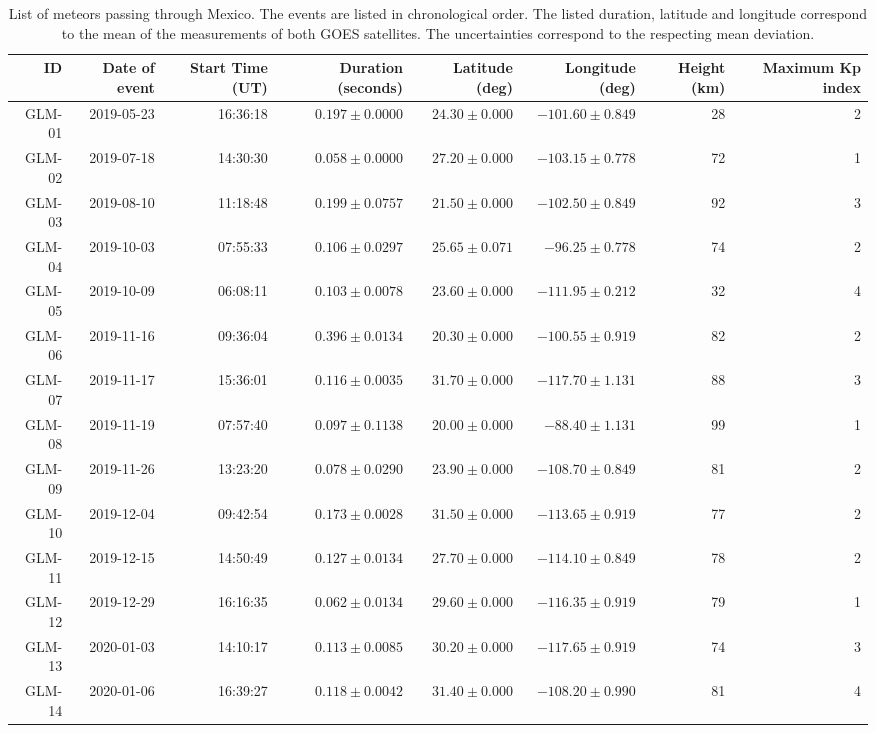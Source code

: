 \begin{table}
  \centering
  \footnotesize
  \caption{List of meteors passing through Mexico. The events are listed in chronological order. The listed duration, latitude and longitude correspond to the mean of the measurements of both GOES satellites. The uncertainties correspond to the respecting mean deviation.}
\label{tab:table-meteors}
\begin{tabular}{rrrrrrrr}
\hline
ID & Date of event & Start Time (UT)  & Duration (seconds) & Latitude (deg) & Longitude (deg) & Height (km) & Maximum Kp index \\
\hline
GLM-01 & 2019-05-23 & 16:36:18 & $0.197\pm 0.0000$ & $24.30 \pm 0.000$ & $-101.60 \pm 0.849$  & 28 & 2\\
GLM-02 & 2019-07-18 & 14:30:30 & $0.058\pm 0.0000$ & $27.20 \pm 0.000$ & $-103.15 \pm 0.778$  & 72 & 1\\
GLM-03 & 2019-08-10 & 11:18:48 & $0.199\pm 0.0757$ & $21.50 \pm 0.000$ & $-102.50  \pm 0.849$ & 92 & 3\\
GLM-04 & 2019-10-03 & 07:55:33 & $0.106\pm 0.0297$ & $25.65 \pm 0.071$ & $-96.25 \pm   0.778$ & 74 & 2\\
GLM-05 & 2019-10-09 & 06:08:11 & $0.103\pm 0.0078$ & $23.60 \pm 0.000$ & $-111.95 \pm  0.212$ & 32 & 4\\
GLM-06 & 2019-11-16 & 09:36:04 & $0.396\pm 0.0134$ & $20.30 \pm 0.000$ & $-100.55 \pm  0.919$ & 82 & 2\\
GLM-07 & 2019-11-17 & 15:36:01 & $0.116\pm 0.0035$ & $31.70 \pm 0.000$ & $-117.70 \pm  1.131$ & 88 & 3\\
GLM-08 & 2019-11-19 & 07:57:40 & $0.097\pm 0.1138$ & $20.00 \pm 0.000$ & $-88.40 \pm  1.131$  & 99 & 1\\
GLM-09 & 2019-11-26 & 13:23:20 & $0.078\pm 0.0290$ & $23.90 \pm 0.000$ & $-108.70 \pm  0.849$ & 81 & 2\\
GLM-10 & 2019-12-04 & 09:42:54 & $0.173\pm 0.0028$ & $31.50 \pm 0.000$ & $-113.65 \pm  0.919$ & 77 & 2\\
GLM-11 & 2019-12-15 & 14:50:49 & $0.127\pm 0.0134$ & $27.70 \pm 0.000$ & $-114.10 \pm  0.849$ & 78 & 2\\
GLM-12 & 2019-12-29 & 16:16:35 & $0.062\pm 0.0134$ & $29.60 \pm 0.000$ & $-116.35 \pm  0.919$ & 79 & 1\\
GLM-13 & 2020-01-03 & 14:10:17 & $0.113\pm 0.0085$ & $30.20 \pm 0.000$ & $-117.65 \pm  0.919$ & 74 & 3\\
GLM-14 & 2020-01-06 & 16:39:27 & $0.118\pm 0.0042$ & $31.40 \pm 0.000$ & $-108.20 \pm  0.990$ & 81 & 4\\

\end{tabular}
\end{table}

